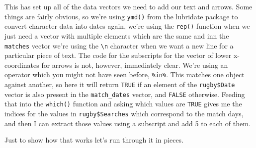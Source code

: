 \documentclass[
]{book}
\begin{document}
This has set up all of the data vectors we need to add our text and arrows. Some things are fairly obvious, so we're using \texttt{ymd()} from the lubridate package to convert character data into dates again, we're using the \texttt{rep()} function when we just need a vector with multiple elements which are the same and inn the \texttt{matches} vector we're using the \texttt{\textbackslash{}n} character when we want a new line for a particular piece of text. The code for the subscripts for the vector of lower x-coordinates for arrows is not, however, immediately clear. We're using an operator which you might not have seen before, \texttt{\%in\%}. This matches one object against another, so here it will return \texttt{TRUE} if an element of the \texttt{rugby\$Date} vector is also present in the \texttt{match\_dates} vector, and \texttt{FALSE} otherwise. Feeding that into the \texttt{which()} function and asking which values are \texttt{TRUE} gives me the indices for the values in \texttt{rugby\$Searches} which correspond to the match days, and then I can extract those values using a subscript and add 5 to each of them.

Just to show how that works let's run through it in pieces.
\end{document}

